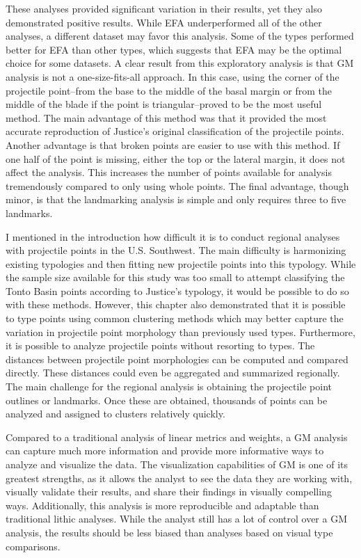 \documentclass{article}
\begin{document}
These analyses provided significant variation in their results, yet they
also demonstrated positive results. While EFA underperformed all of the
other analyses, a different dataset may favor this analysis. Some of the
types performed better for EFA than other types, which suggests that EFA
may be the optimal choice for some datasets. A clear result from this
exploratory analysis is that GM analysis is not a one-size-fits-all
approach. In this case, using the corner of the projectile point--from
the base to the middle of the basal margin or from the middle of the
blade if the point is triangular--proved to be the most useful method.
The main advantage of this method was that it provided the most accurate
reproduction of Justice's original classification of the projectile
points. Another advantage is that broken points are easier to use with
this method. If one half of the point is missing, either the top or the
lateral margin, it does not affect the analysis. This increases the
number of points available for analysis tremendously compared to only
using whole points. The final advantage, though minor, is that the
landmarking analysis is simple and only requires three to five
landmarks.

I mentioned in the introduction how difficult it is to conduct regional
analyses with projectile points in the U.S. Southwest. The main
difficulty is harmonizing existing typologies and then fitting new
projectile points into this typology. While the sample size available
for this study was too small to attempt classifying the Tonto Basin
points according to Justice's typology, it would be possible to do so
with these methods. However, this chapter also demonstrated that it is
possible to type points using common clustering methods which may better
capture the variation in projectile point morphology than previously
used types. Furthermore, it is possible to analyze projectile points
without resorting to types. The distances between projectile point
morphologies can be computed and compared directly. These distances
could even be aggregated and summarized regionally. The main challenge
for the regional analysis is obtaining the projectile point outlines or
landmarks. Once these are obtained, thousands of points can be analyzed
and assigned to clusters relatively quickly.

Compared to a traditional analysis of linear metrics and weights, a GM
analysis can capture much more information and provide more informative
ways to analyze and visualize the data. The visualization capabilities
of GM is one of its greatest strengths, as it allows the analyst to see
the data they are working with, visually validate their results, and
share their findings in visually compelling ways. Additionally, this
analysis is more reproducible and adaptable than traditional lithic
analyses. While the analyst still has a lot of control over a GM
analysis, the results should be less biased than analyses based on
visual type comparisons.
\end{document}

